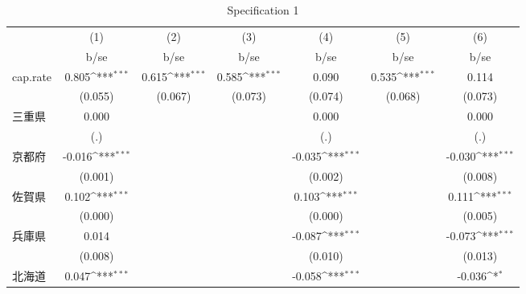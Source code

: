 \begin{table}[htbp]\centering
\def\sym#1{\ifmmode^{#1}\else\(^{#1}\)\fi}
\caption{Specification 1}
\begin{tabular}{l*{6}{c}}
\hline\hline
                    &\multicolumn{1}{c}{(1)}&\multicolumn{1}{c}{(2)}&\multicolumn{1}{c}{(3)}&\multicolumn{1}{c}{(4)}&\multicolumn{1}{c}{(5)}&\multicolumn{1}{c}{(6)}\\
                    &        b/se         &        b/se         &        b/se         &        b/se         &        b/se         &        b/se         \\
\hline
cap.rate            &       0.805\sym{***}&       0.615\sym{***}&       0.585\sym{***}&       0.090         &       0.535\sym{***}&       0.114         \\
                    &     (0.055)         &     (0.067)         &     (0.073)         &     (0.074)         &     (0.068)         &     (0.073)         \\
三重県              &       0.000         &                     &                     &       0.000         &                     &       0.000         \\
                    &         (.)         &                     &                     &         (.)         &                     &         (.)         \\
京都府              &      -0.016\sym{***}&                     &                     &      -0.035\sym{***}&                     &      -0.030\sym{***}\\
                    &     (0.001)         &                     &                     &     (0.002)         &                     &     (0.008)         \\
佐賀県              &       0.102\sym{***}&                     &                     &       0.103\sym{***}&                     &       0.111\sym{***}\\
                    &     (0.000)         &                     &                     &     (0.000)         &                     &     (0.005)         \\
兵庫県              &       0.014         &                     &                     &      -0.087\sym{***}&                     &      -0.073\sym{***}\\
                    &     (0.008)         &                     &                     &     (0.010)         &                     &     (0.013)         \\
北海道              &       0.047\sym{***}&                     &                     &      -0.058\sym{***}&                     &      -0.036\sym{*}  \\

\end{tabular}
\end{table}
